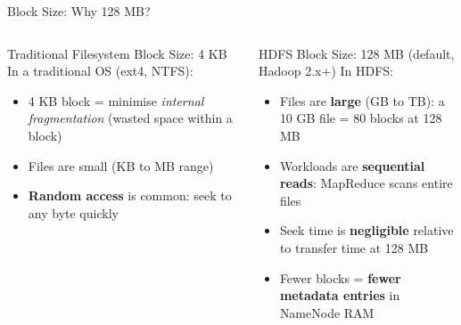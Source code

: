 \documentclass[aspectratio=169,10pt]{beamer}
\begin{document}
\begin{frame}{Block Size: Why 128 MB?}
  \begin{columns}[T]
      \begin{block}{Traditional Filesystem Block Size: 4 KB}
        In a traditional OS (ext4, NTFS):
        \begin{itemize}
          \item 4 KB block = minimise \emph{internal fragmentation} (wasted space within a block)
          \item Files are small (KB to MB range)
          \item \textbf{Random access} is common: seek to any byte quickly
        \end{itemize}
      \end{block}
      \vspace{6pt}
      \begin{exampleblock}{HDFS Block Size: 128 MB (default, Hadoop 2.x+)}
        In HDFS:
        \begin{itemize}
          \item Files are \textbf{large} (GB to TB): a 10 GB file = 80 blocks at 128 MB
          \item Workloads are \textbf{sequential reads}: MapReduce scans entire files
          \item Seek time is \textbf{negligible} relative to transfer time at 128 MB
          \item Fewer blocks = \textbf{fewer metadata entries} in NameNode RAM
        \end{itemize}
      \end{exampleblock}


\end{columns}
\end{frame}
\end{document}
